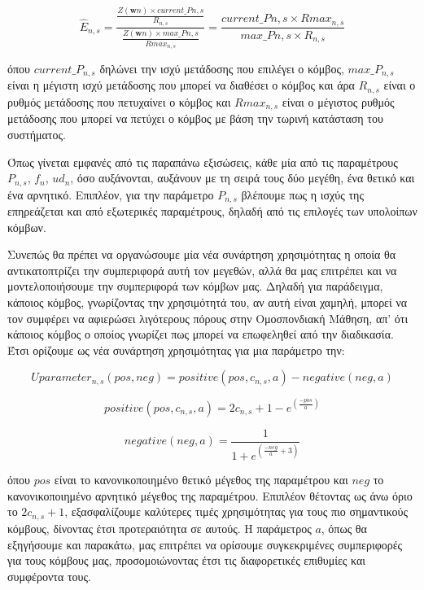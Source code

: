 \vspace{-5pt}

\begin{equation}
\hat{E}_{n,s}=\frac{\frac{Z(\mathbf{w}n)\times current\_P{n,s}}{R_{n,s}}}{\frac{Z(\mathbf{w}n)\times max\_P{n,s}}{Rmax_{n,s}}} = \frac{current\_P{n,s}\times Rmax_{n,s}}{max\_P{n,s}\times R_{n,s}}
\label{eq23}
\end{equation}

\vspace{-3pt}

\noindent
όπου $current\_P_{n,s}$ δηλώνει την ισχύ μετάδοσης που επιλέγει ο κόμβος, $max\_P_{n,s}$ είναι η μέγιστη ισχύ μετάδοσης που μπορεί να διαθέσει ο κόμβος και άρα $R_{n,s}$ είναι ο ρυθμός μετάδοσης που πετυχαίνει ο κόμβος και $Rmax_{n,s}$ είναι ο μέγιστος ρυθμός μετάδοσης που μπορεί να πετύχει ο κόμβος με βάση την τωρινή κατάσταση του συστήματος.

Όπως γίνεται εμφανές από τις παραπάνω εξισώσεις, κάθε μία από τις παραμέτρους $P_{n,s}$, $f_n$, $ud_n$, όσο αυξάνονται, αυξάνουν με τη σειρά τους δύο μεγέθη, ένα θετικό και ένα αρνητικό. Επιπλέον, για την παράμετρο $P_{n,s}$ βλέπουμε πως η ισχύς της επηρεάζεται και από εξωτερικές παραμέτρους, δηλαδή από τις επιλογές των υπολοίπων κόμβων.

Συνεπώς θα πρέπει να οργανώσουμε μία νέα συνάρτηση χρησιμότητας η οποία θα αντικατοπτρίζει την συμπεριφορά αυτή τον μεγεθών, αλλά θα μας επιτρέπει και να μοντελοποιήσουμε την συμπεριφορά των κόμβων μας. Δηλαδή για παράδειγμα, κάποιος κόμβος, γνωρίζοντας την χρησιμότητά του, αν αυτή είναι χαμηλή, μπορεί να τον συμφέρει να αφιερώσει λιγότερους πόρους στην Ομοσπονδιακή Μάθηση, απ' ότι κάποιος κόμβος ο οποίος γνωρίζει πως μπορεί να επωφεληθεί από την διαδικασία. Έτσι ορίζουμε ως νέα συνάρτηση χρησιμότητας για μια παράμετρο την:

\vspace{-5pt}

\begin{equation}
Uparameter_{n,s}(pos, neg) = positive(pos, c_{n,s}, a) - negative(neg, a) 
\label{eq24}
\end{equation}

\vspace{-3pt}

\[positive(pos, c_{n,s}, a) = 2c_{n,s} + 1 - e^{(\frac{-pos}{a})}\]

\[negative(neg, a) = \frac{1}{1 + e^{(\frac{-neg}{a} + 3)}}\]

\noindent
όπου $pos$ είναι το κανονικοποιημένο θετικό μέγεθος της παραμέτρου και $neg$ το κανονικοποιημένο αρνητικό μέγεθος της παραμέτρου. Επιπλέον θέτοντας ως άνω όριο το $2c_{n,s} + 1$, εξασφαλίζουμε καλύτερες τιμές χρησιμότητας για τους πιο σημαντικούς κόμβους, δίνοντας έτσι προτεραιότητα σε αυτούς. Η παράμετρος $a$, όπως θα εξηγήσουμε και παρακάτω, μας επιτρέπει να ορίσουμε συγκεκριμένες συμπεριφορές για τους κόμβους μας, προσομοιώνοντας έτσι τις διαφορετικές επιθυμίες και συμφέροντα τους.

